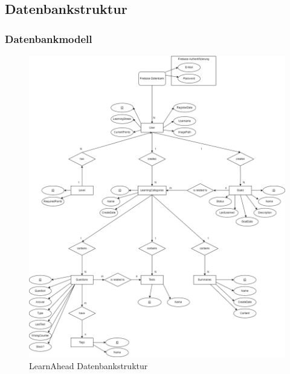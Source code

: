     \subsection{Datenbankstruktur}
    \subsubsection{Datenbankmodell}
    \begin{figure}[H]
        \centering
        \includegraphics[width=1\textwidth]{images/LearnAheadDatenbankstruktur.png}
        \caption{LearnAhead Datenbankstruktur}
        \label{fig:LearnAheadDatenbankstruktur}
    \end{figure}\noindent

